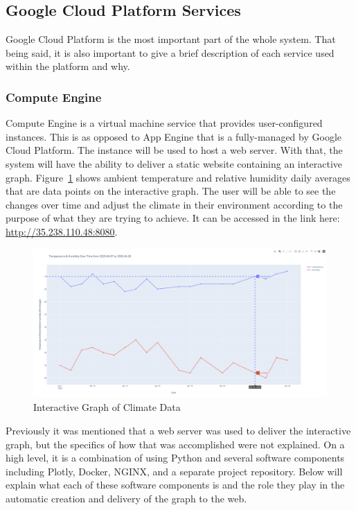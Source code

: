 \documentclass{article}
\begin{document}
\subsection{Google Cloud Platform Services}
\label{section:gcp}
Google Cloud Platform is the most important part of the whole system. That being said, it is also important to give a brief description of each service used within the platform and why.

\subsubsection{Compute Engine}
\label{section:compute-engine}
Compute Engine is a virtual machine service that provides user-configured instances. This is as opposed to App Engine that is a fully-managed by Google Cloud Platform. The instance will be used to host a web server. With that, the system will have the ability to deliver a static website containing an interactive graph. Figure~\ref{fig:interactive-graph} shows ambient temperature and relative humidity daily averages that are data points on the interactive graph. The user will be able to see the changes over time and adjust the climate in their environment according to the purpose of what they are trying to achieve. It can be accessed in the link here: \url{http://35.238.110.48:8080}.

\begin{figure}[H]
    \center
    \includegraphics[width=\textwidth]{images/interactive-graph.png}
    \caption{Interactive Graph of Climate Data}
    \label{fig:interactive-graph}
\end{figure}

Previously it was mentioned that a web server was used to deliver the interactive graph, but the specifics of how that was accomplished were not explained. On a high level, it is a combination of using Python and several software components including Plotly, Docker, NGINX, and a separate project repository. Below will explain what each of these software components is and the role they play in the automatic creation and delivery of the graph to the web.\\
\end{document}
